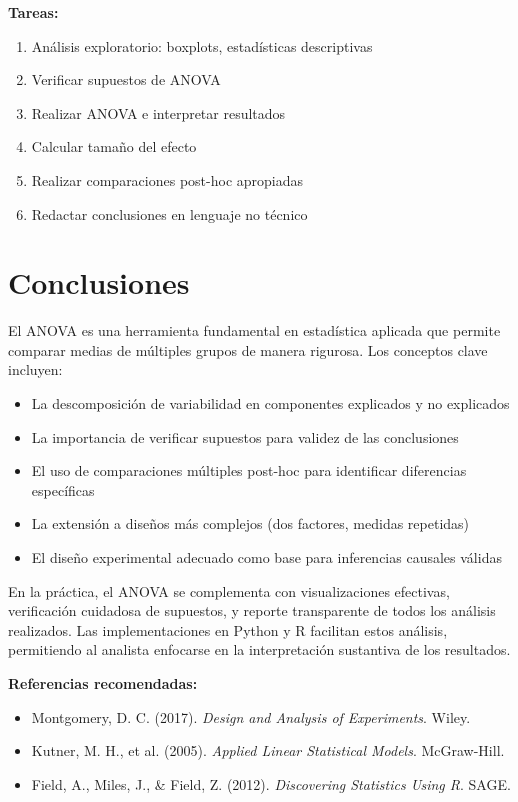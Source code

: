 \documentclass[11pt,a4paper]{article}
\theoremstyle{definition}
\begin{document}
\textbf{Tareas:}
\begin{enumerate}
    \item Análisis exploratorio: boxplots, estadísticas descriptivas
    \item Verificar supuestos de ANOVA
    \item Realizar ANOVA e interpretar resultados
    \item Calcular tamaño del efecto
    \item Realizar comparaciones post-hoc apropiadas
    \item Redactar conclusiones en lenguaje no técnico
\end{enumerate}

\section{Conclusiones}

El ANOVA es una herramienta fundamental en estadística aplicada que permite comparar medias de múltiples grupos de manera rigurosa. Los conceptos clave incluyen:

\begin{itemize}
    \item La descomposición de variabilidad en componentes explicados y no explicados
    \item La importancia de verificar supuestos para validez de las conclusiones
    \item El uso de comparaciones múltiples post-hoc para identificar diferencias específicas
    \item La extensión a diseños más complejos (dos factores, medidas repetidas)
    \item El diseño experimental adecuado como base para inferencias causales válidas
\end{itemize}

En la práctica, el ANOVA se complementa con visualizaciones efectivas, verificación cuidadosa de supuestos, y reporte transparente de todos los análisis realizados. Las implementaciones en Python y R facilitan estos análisis, permitiendo al analista enfocarse en la interpretación sustantiva de los resultados.

\vspace{1cm}

\noindent\textbf{Referencias recomendadas:}
\begin{itemize}
    \item Montgomery, D. C. (2017). \textit{Design and Analysis of Experiments}. Wiley.
    \item Kutner, M. H., et al. (2005). \textit{Applied Linear Statistical Models}. McGraw-Hill.
    \item Field, A., Miles, J., \& Field, Z. (2012). \textit{Discovering Statistics Using R}. SAGE.
\end{itemize}
\end{document}
